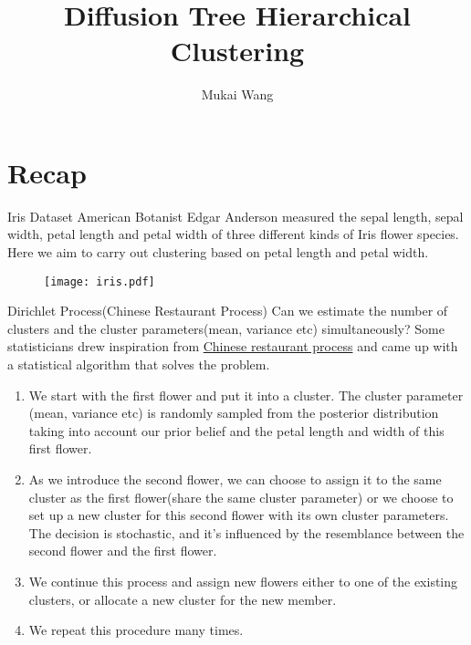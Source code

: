 \documentclass{beamer}
\title[Bayesian Hierarchical Clustering]{Diffusion Tree Hierarchical Clustering}
\author{Mukai Wang}
\begin{document}
	\begin{frame}
		\titlepage
	\end{frame}
	
	\section{Recap}
	\begin{frame}
		\tableofcontents
		[
		currentsection,
		currentsubsection,
		subsectionstyle=show/shaded/hide
		]
	\end{frame}
	
	\begin{frame}{Iris Dataset}
		American Botanist Edgar Anderson measured the sepal length, sepal width, petal length and petal width of three different kinds of Iris flower species. Here we aim to carry out clustering based on petal length and petal width.
		\begin{figure}[htbp]
		\centering
		\texttt{[image: iris.pdf]}
		\end{figure}
	\end{frame}
	
	\begin{frame}{Dirichlet Process(Chinese Restaurant Process)}
		Can we estimate the number of clusters and the cluster parameters(mean, variance etc) simultaneously? Some statisticians drew inspiration from 
		\href{https://topicmodels.west.uni-koblenz.de/ckling/tmt/crp.html?parameters=10&dp=1}{Chinese restaurant process} and came up with a statistical algorithm that solves the problem.
		\pause
		\begin{enumerate}
			\item We start with the first flower and put it into a cluster. The cluster parameter (mean, variance etc) is randomly sampled from the posterior distribution taking into account our prior belief and the petal length and width of this first flower.
			\pause
			\item As we introduce the second flower, we can choose to assign it to the same cluster as the first flower(share the same cluster parameter) or we choose to set up a new cluster for this second flower with its own cluster parameters. The decision is stochastic, and it's influenced by the resemblance between the second flower and the first flower.
			\pause
			\item We continue this process and assign new flowers either to one of the existing clusters, or allocate a new cluster for the new member.
			\pause
			\item We repeat this procedure many times. 
		\end{enumerate}
	\end{frame}	
	
\end{document}
